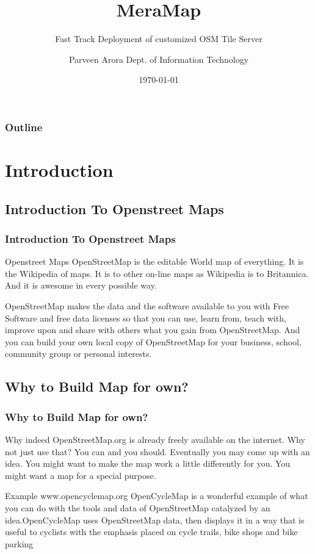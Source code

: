 \documentclass{beamer}
\title{MeraMap}
\subtitle{Fast Track Deployment of customized OSM Tile Server}
\author[Guru Nanak Dev Engineering College] {Parveen Arora \linebreak Dept. of Information Technology \linebreak \linebreak}
\date{\today}
\begin{document}
\bfseries
\frame{\titlepage}

\begin{frame}
  \frametitle{Outline}
\end{frame}

\section{Introduction}
\subsection{Introduction To Openstreet Maps}
\begin{frame}  
\frametitle{Introduction To Openstreet Maps}
\begin{block}{Openstreet Maps}
OpenStreetMap is the editable World map of everything. It is the Wikipedia of maps. It is to other on-line maps as Wikipedia is to Britannica. And it is awesome in every possible way.
\end{block}
\pause
\begin{block}{}
OpenStreetMap makes the data and the software available to you with Free Software and free data licenses so that you can use, learn from, teach with, improve upon and share with others what you gain from OpenStreetMap. And you can build your own local copy of OpenStreetMap for your business, school, community group or personal interests.
\end{block}
\end{frame}

\subsection{Why to Build Map for own?}
\begin{frame}  
\frametitle{Why to Build Map for own?}
\begin{block}{Why indeed}
OpenStreetMap.org is already freely available on the internet. Why not just use that? You can and you should. Eventually you may come up with an idea. You might want to make the map work a little differently for you. You might want a map for a special purpose.
\end{block}
\pause
\begin{block}{Example}
www.opencyclemap.org OpenCycleMap is a wonderful example of what you can do with the tools and data of OpenStreetMap catalyzed by an idea.OpenCycleMap uses OpenStreetMap data, then displays it in a way that is useful to cyclists with the emphasis placed on cycle trails, bike shops and bike parking
\end{block}
\end{frame}
\end{document}
